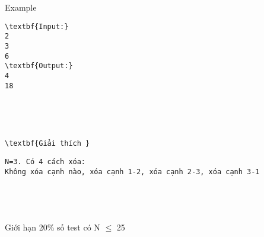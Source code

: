 Example
\begin{verbatim}
\textbf{Input:}
2
3
6
\textbf{Output:}  
4
18\end{verbatim}

 

 
\begin{verbatim}
\textbf{Giải thích }\end{verbatim}
\begin{verbatim}
N=3. Có 4 cách xóa:
Không xóa cạnh nào, xóa cạnh 1-2, xóa cạnh 2-3, xóa cạnh 3-1 \end{verbatim}
\begin{verbatim}
 \end{verbatim}
\begin{verbatim}
 \end{verbatim}
Giới hạn
20\% số test có N  $\le$  25  